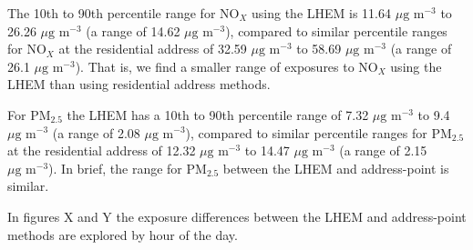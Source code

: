 The 10th to 90th percentile range for NO$_{X}$ using the LHEM is 11.64 $\mu \text{g m}^{-3}$ to 26.26 $\mu \text{g m}^{-3}$ (a range of 14.62 $\mu \text{g m}^{-3}$), compared to similar percentile ranges for NO$_{X}$ at the residential address of 32.59 $\mu \text{g m}^{-3}$ to 58.69 $\mu \text{g m}^{-3}$ (a range of 26.1 $\mu \text{g m}^{-3}$). That is, we find a smaller range of exposures to NO$_{X}$ using the LHEM than using residential address methods. 

For PM$_{2.5}$ the LHEM has a 10th to 90th percentile range of 7.32 $\mu \text{g m}^{-3}$ to 9.4 $\mu \text{g m}^{-3}$ (a range of 2.08 $\mu \text{g m}^{-3}$), compared to similar percentile ranges for PM$_{2.5}$ at the residential address of 12.32 $\mu \text{g m}^{-3}$ to 14.47 $\mu \text{g m}^{-3}$ (a range of 2.15 $\mu \text{g m}^{-3}$). In brief, the range for PM$_{2.5}$ between the LHEM and address-point is similar.

In figures X and Y the exposure differences between the LHEM and address-point methods are explored by hour of the day.